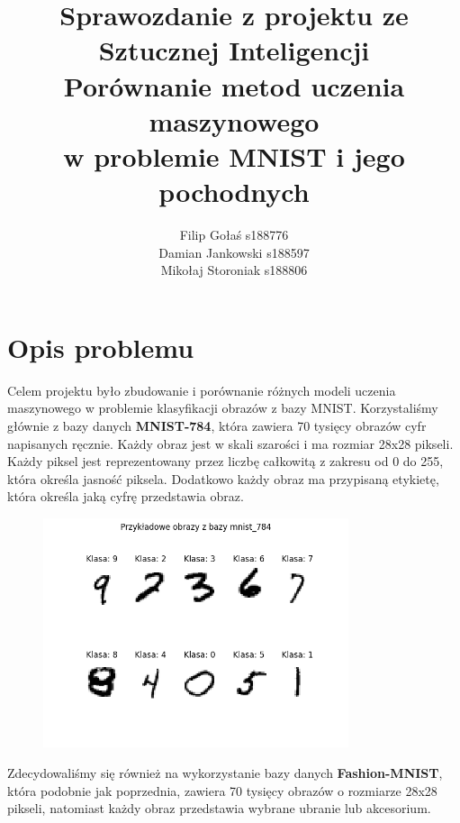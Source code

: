 \documentclass{article}
\title{Sprawozdanie z projektu ze Sztucznej Inteligencji \\ 
Porównanie metod uczenia maszynowego \\ 
w problemie MNIST i jego pochodnych}
\author{Filip Gołaś s188776 \\ Damian Jankowski s188597 \\ Mikołaj Storoniak s188806}
\begin{document}
\maketitle

\begin{multicols}{2}
    \tableofcontents
\end{multicols}

\newpage

\section{Opis problemu}

Celem projektu było zbudowanie i porównanie różnych
modeli uczenia maszynowego w problemie klasyfikacji
obrazów z bazy MNIST. Korzystaliśmy głównie z bazy
danych \textbf{MNIST-784}, która zawiera 70 tysięcy obrazów
cyfr napisanych ręcznie. Każdy obraz jest w skali
szarości i ma rozmiar 28x28 pikseli. Każdy piksel
jest reprezentowany przez liczbę całkowitą z zakresu
od 0 do 255, która określa jasność piksela. Dodatkowo
każdy obraz ma przypisaną etykietę, która określa
jaką cyfrę przedstawia obraz.

\begin{figure}[H]
    \centering
    \includegraphics[width=0.8\textwidth]{img/baza_mnist_784.png}
\end{figure}

Zdecydowaliśmy się również na wykorzystanie bazy
danych \textbf{Fashion-MNIST}, która podobnie jak poprzednia, zawiera
70 tysięcy obrazów o rozmiarze 28x28 pikseli, natomiast
każdy obraz przedstawia wybrane ubranie lub akcesorium.
\end{document}
